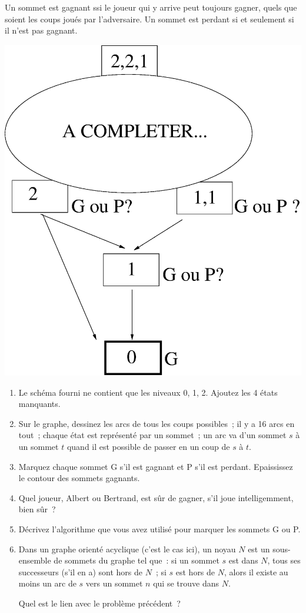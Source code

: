 \documentclass[11pt]{article}
\begin{document}
Un sommet est gagnant ssi le joueur qui y arrive peut toujours gagner, quels que soient les coups joués par l'adversaire.
Un sommet est perdant si et seulement si il n'est pas gagnant.

\begin{center}
\includegraphics[width=0.65\linewidth]{nim2.eps}
\end{center}

\begin{enumerate}
\item Le schéma fourni ne contient que les niveaux 0, 1, 2. Ajoutez les 4 états manquants.


\item Sur le graphe, dessinez les arcs de tous les coups possibles~; il y a 16 arcs en tout~; chaque état  est représenté par un sommet~; un arc va d'un sommet $s$ à un sommet $t$ quand il est possible de passer en un coup de $s$ à $t$. 

\item Marquez chaque sommet G s'il est gagnant et P s'il est perdant. Epaississez le contour des sommets gagnants.

\item  Quel joueur, Albert ou Bertrand, est sûr de gagner, s'il joue intelligemment, bien sûr~?

\item  Décrivez l'algorithme que vous avez utilisé pour marquer les sommets G ou P.

\item  Dans un graphe orienté acyclique (c'est le cas ici), un noyau $N$ est 
un sous-ensemble de sommets du graphe tel que~: si  un sommet $s$ est dans $N$, tous ses successeurs (s'il en a) sont hors de $N$~; si $s$ est hors de $N$, alors il existe au moins un arc de $s$ vers un sommet $n$ qui se trouve dans $N$. 

Quel est le lien avec le problème précédent~? 

\end{enumerate}
\end{document}

